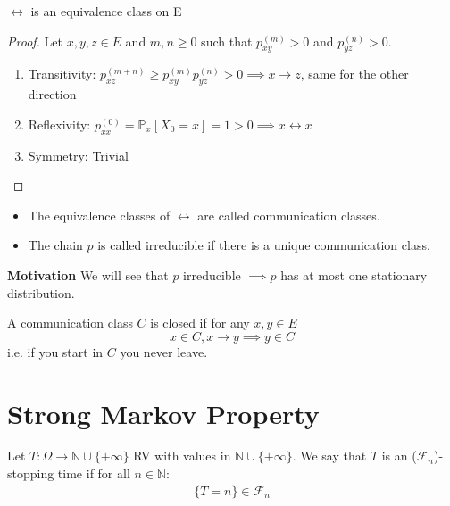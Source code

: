 \begin{prop}[]
	$\leftrightarrow$ is an equivalence class on E
\end{prop}
\begin{proof}
	Let $x,y,z \in E$ and $m,n \geq 0$ such that $p_{xy}^{(m)}>0$ and $p_{yz}^{(n)}>0$.
\begin{enumerate}
	\item Transitivity: $p_{xz}^{(m+n)} \geq p_{xy}^{(m)}p_{yz}^{(n)} >0 \implies x\rightarrow z$, same for the other direction 
	\item Reflexivity: $p_{xx}^{(0)} = \mathbb{P}_{x} \left[ X_0 = x \right] =1>0 \implies x \leftrightarrow x$ 
	\item Symmetry: Trivial
\end{enumerate}
\end{proof}


\begin{defn} \hfill
\begin{itemize}
\item The equivalence classes of $\leftrightarrow$ are called communication classes.
\item The chain $p$ is called irreducible if there is a unique communication class.
\end{itemize}
\end{defn}

\noindent
\textbf{Motivation} We will see that $p$ irreducible $\implies p$ has at most one stationary distribution.

\begin{defn}
	A communication class $C$ is closed if for any $x,y \in E$
\begin{equation}
 x \in C, x \to y \implies y \in C
\end{equation}
i.e. if you start in $C$ you never leave.
\end{defn}

\section{Strong Markov Property}
	
\begin{defn}
	Let $T:\Omega \to \mathbb{N} \cup \{+\infty\}$ RV with values in $\mathbb{N}\cup\{+\infty\}$. We say that $T$ is an ($ \mathcal{F}_n$)-stopping time if for all $n \in \mathbb{N}$:
	\begin{align}
		\{T=n\} \in \mathcal{F}_n
	\end{align}
\end{defn}

